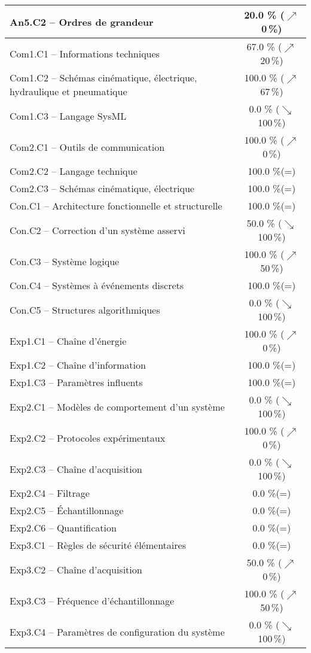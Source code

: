 \begin{center}
\begin{tabular}{|p{.7\linewidth}|c|}
An5.C2 -- Ordres de grandeur&20.0 \% ($\nearrow$ 0\,\%)\\ \hline 
Com1.C1 -- Informations techniques&67.0 \% ($\nearrow$ 20\,\%)\\ \hline 
Com1.C2 -- Schémas cinématique, électrique, hydraulique et pneumatique&100.0 \% ($\nearrow$ 67\,\%)\\ \hline 
Com1.C3 -- Langage SysML&0.0 \% ($\searrow$ 100\,\%)\\ \hline 
Com2.C1 -- Outils de communication&100.0 \% ($\nearrow$ 0\,\%)\\ \hline 
Com2.C2 -- Langage technique&100.0 \%(=)\\ \hline 
Com2.C3 -- Schémas cinématique, électrique&100.0 \%(=)\\ \hline 
Con.C1 -- Architecture fonctionnelle et structurelle&100.0 \%(=)\\ \hline 
Con.C2 -- Correction d’un système asservi&50.0 \% ($\searrow$ 100\,\%)\\ \hline 
Con.C3 -- Système logique&100.0 \% ($\nearrow$ 50\,\%)\\ \hline 
Con.C4 -- Systèmes à événements discrets&100.0 \%(=)\\ \hline 
Con.C5 -- Structures algorithmiques&0.0 \% ($\searrow$ 100\,\%)\\ \hline 
Exp1.C1 -- Chaîne d’énergie&100.0 \% ($\nearrow$ 0\,\%)\\ \hline 
Exp1.C2 -- Chaîne d’information&100.0 \%(=)\\ \hline 
Exp1.C3 -- Paramètres influents&100.0 \%(=)\\ \hline 
Exp2.C1 -- Modèles de comportement d’un système&0.0 \% ($\searrow$ 100\,\%)\\ \hline 
Exp2.C2 -- Protocoles expérimentaux&100.0 \% ($\nearrow$ 0\,\%)\\ \hline 
Exp2.C3 -- Chaîne d’acquisition&0.0 \% ($\searrow$ 100\,\%)\\ \hline 
Exp2.C4 -- Filtrage&0.0 \%(=)\\ \hline 
Exp2.C5 -- Échantillonnage&0.0 \%(=)\\ \hline 
Exp2.C6 -- Quantification&0.0 \%(=)\\ \hline 
Exp3.C1 -- Règles de sécurité élémentaires&0.0 \%(=)\\ \hline 
Exp3.C2 -- Chaîne d'acquisition&50.0 \% ($\nearrow$ 0\,\%)\\ \hline 
Exp3.C3 -- Fréquence d’échantillonnage&100.0 \% ($\nearrow$ 50\,\%)\\ \hline 
Exp3.C4 -- Paramètres de configuration du système&0.0 \% ($\searrow$ 100\,\%)\\ \hline 

\end{tabular}
\end{center}
